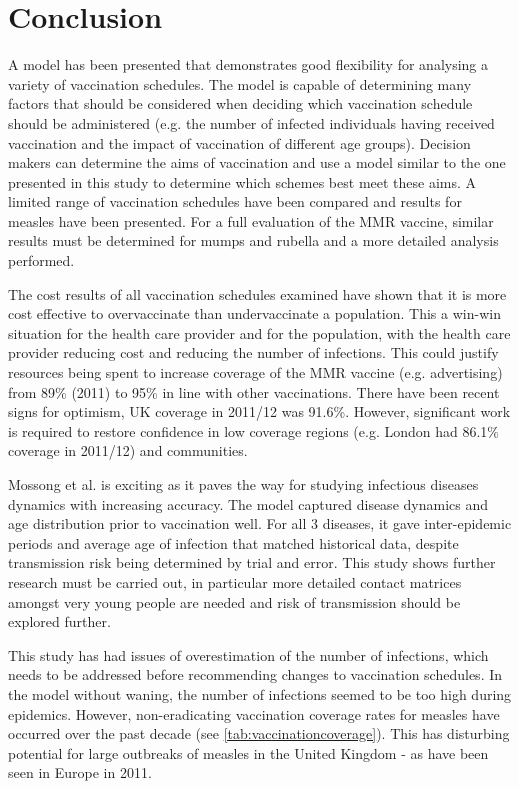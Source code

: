 \documentclass[a4paper,11pt] {scrartcl}
\begin{document}
\section{Conclusion}
\label{sec:conclusion}
A model has been presented that demonstrates good flexibility for analysing a variety of vaccination schedules. The model is capable of determining many factors that should be considered when deciding which vaccination schedule should be administered (e.g. the number of infected individuals having received vaccination and the impact of vaccination of different age groups). Decision makers can determine the aims of vaccination and use a model similar to the one presented in this study to determine which schemes best meet these aims. A limited range of vaccination schedules have been compared and results for measles have been presented. For a full evaluation of the MMR vaccine, similar results must be determined for mumps and rubella and a more detailed analysis performed.

The cost results of all vaccination schedules examined have shown that it is more cost effective to overvaccinate than undervaccinate a population. This a win-win situation for the health care provider and for the population, with the health care provider reducing cost and reducing the number of infections. This could justify resources being spent to increase coverage of the MMR vaccine (e.g. advertising) from 89\% (2011) to 95\% in line with other vaccinations\cite{hpaimmunistationcoverage}. There have been recent signs for optimism, UK coverage in 2011/12 was 91.6\%\cite{vaccinationcoverage2012}. However, significant work is required to restore confidence in low coverage regions (e.g. London had 86.1\% coverage in 2011/12\cite{vaccinationcoverage2012}) and communities.

Mossong et al.\cite{mossong2008social} is exciting as it paves the way for studying infectious diseases dynamics with increasing accuracy. The model captured disease dynamics and age distribution prior to vaccination well. For all 3 diseases, it gave inter-epidemic periods and average age of infection that matched historical data, despite transmission risk being determined by trial and error. This study shows further research must be carried out, in particular more detailed contact matrices amongst very young people are needed and risk of transmission should be explored further.

This study has had issues of overestimation of the number of infections, which needs to be addressed before recommending changes to vaccination schedules. In the model without waning, the number of infections seemed to be too high during epidemics. However, non-eradicating vaccination coverage rates for measles have occurred over the past decade (see \autoref{tab:vaccinationcoverage}). This has disturbing potential for large outbreaks of measles in the United Kingdom - as have been seen in Europe in 2011\cite{measleseuropeoutbreak2011}.
\end{document}
